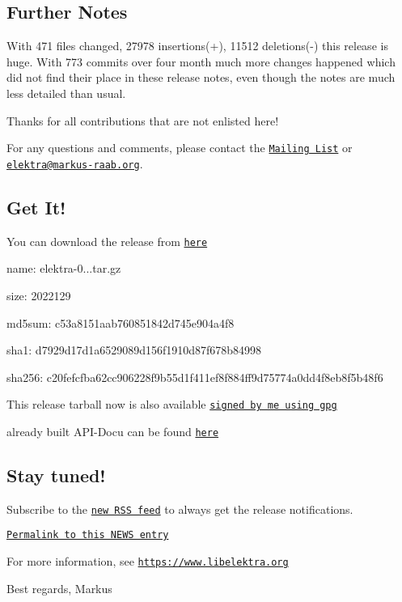 \subsection*{Further Notes}

With 471 files changed, 27978 insertions(+), 11512 deletions(-\/) this release is huge. With 773 commits over four month much more changes happened which did not find their place in these release notes, even though the notes are much less detailed than usual.

Thanks for all contributions that are not enlisted here!

For any questions and comments, please contact the \href{https://lists.sourceforge.net/lists/listinfo/registry-list}{\tt Mailing List} or \href{mailto:elektra@markus-raab.org}{\tt elektra@markus-\/raab.\+org}.

\subsection*{Get It!}

You can download the release from \href{http://www.markus-raab.org/ftp/elektra/releases/elektra-0.8.11.tar.gz}{\tt here}


\begin{DoxyItemize}
\item name\+: elektra-\/0...\+tar.\+gz
\item size\+: 2022129
\item md5sum\+: c53a8151aab760851842d745e904a4f8
\item sha1\+: d7929d17d1a6529089d156f1910d87f678b84998
\item sha256\+: c20fefcfba62cc906228f9b55d1f411ef8f884ff9d75774a0dd4f8eb8f5b48f6
\end{DoxyItemize}

This release tarball now is also available \href{http://www.markus-raab.org/ftp/elektra/releases/elektra-0.8.11.tar.gz.gpg}{\tt signed by me using gpg}

already built A\+P\+I-\/\+Docu can be found \href{https://doc.libelektra.org/api/0.8.11/html/}{\tt here}

\subsection*{Stay tuned!}

Subscribe to the \href{https://doc.libelektra.org/news/feed.rss}{\tt new R\+SS feed} to always get the release notifications.

\href{https://doc.libelektra.org/news/7d4647d4-4131-411e-9c2a-2aca39446e18.html}{\tt Permalink to this N\+E\+WS entry}

For more information, see \href{https://www.libelektra.org}{\tt https\+://www.\+libelektra.\+org}

Best regards, Markus 